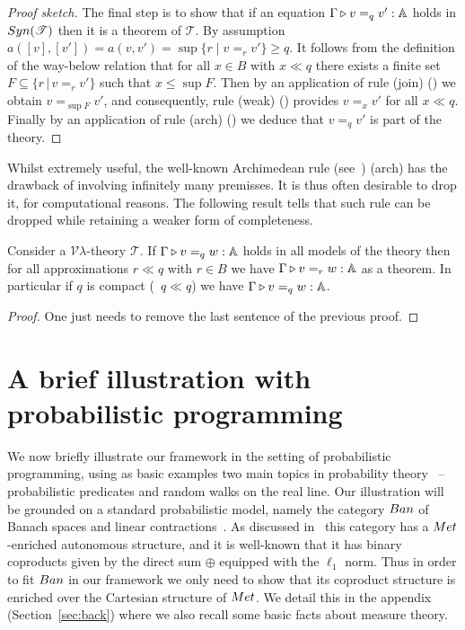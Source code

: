 \documentclass[a4paper,UKenglish,cleveref, autoref, thm-restate]{lipics-v2021}
\begin{document}
\begin{proof}[Proof sketch]
The final step is to show that if an equation $\Gamma \triangleright v =_q v' : \mathbb{A}$
holds in $\catfont{Syn}(\mathscr{T})$ then it is a theorem of $\mathscr{T}$. By
assumption $a([v],[v']) = a(v,v') =  \sup{ \{r \mid v =_r v'\}} \geq q$. It
follows from the definition of the way-below relation that for all $x \in B$
with $x \ll q$ there exists a finite set $F \subseteq \{r \, \vert \, v =_r
v'\}$ such that $x \leq \sup F$. Then by an application of rule (join)
(\cite[Figure 4]{dahlqvist2023syntactic}) we obtain $v =_{\sup F} v'$, and
consequently, rule (weak) (\cite[Figure 4]{dahlqvist2023syntactic}) provides $v
=_x v'$ for all $x \ll q$. Finally by an application of rule (arch)
(\cite[Figure 4]{dahlqvist2023syntactic}) we deduce that $v =_q v'$ is part of
the theory.
\end{proof}
Whilst extremely useful, the well-known Archimedean rule
(see~\cite{dahlqvist22,dahlqvist2023syntactic,mardare2016quantitative}) (arch)
has the drawback of involving infinitely many premisses. It is thus often
desirable to drop it, for computational reasons. The following result tells that
such rule can be dropped while retaining a weaker form of completeness.
\begin{theorem}
        Consider a $\mathcal{V}\lambda$-theory $\mathscr{T}$.  If 
        $\Gamma \triangleright v =_q w : \mathbb{A}$ holds in all
        models of the theory then for all approximations $r \ll q$ with $r \in
        B$ we have $\Gamma \triangleright v =_r w : \mathbb{A}$ as a theorem. In particular
        if $q$ is compact (\ie\ $q \ll q$) we have $\Gamma \triangleright v =_q w :
        \mathbb{A}$.
\end{theorem}

\begin{proof}
One just needs to remove the last sentence of the previous proof.
\end{proof}
\section{A brief illustration with probabilistic programming}
\label{sec:ex}

We now briefly illustrate our framework in the setting of probabilistic
programming, using as basic examples two main topics in probability
theory~\cite{dudley18} -- probabilistic predicates and random walks on the real
line.  Our illustration will be grounded on a standard probabilistic model,
namely the category $\Ban$ of Banach spaces and linear
contractions~\cite{dahlqvist19}. As discussed
in~\cite{dahlqvist22,dahlqvist2023syntactic} this category has a
$\Met$-enriched autonomous structure, and it is well-known that it has binary
coproducts given by the direct sum $\oplus$ equipped with the $\ell_1$ norm.
Thus in order to fit $\Ban$ in our framework we only need to show that its
coproduct structure is enriched over the Cartesian structure of $\Met$. We
detail this in the appendix (Section~\ref{sec:back}) where we also recall some
basic facts about measure theory.
\end{document}
